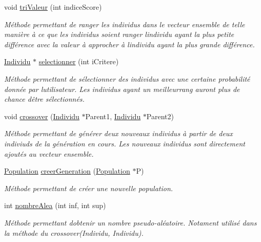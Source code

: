 \begin{DoxyCompactItemize}
void \hyperlink{class_population_a4b167d07f145a1f1ea69b2bb4cfd2cfb}{tri\+Valeur} (int indice\+Score)
\begin{DoxyCompactList}\small\item\em Méthode permettant de ranger les individus dans le vecteur ensemble de telle manière à ce que les individus soient ranger l\textquotesingle{}individu ayant la plus petite différence avec la valeur à approcher à l\textquotesingle{}individu ayant la plus grande différence. \end{DoxyCompactList}\item 
\hyperlink{class_individu}{Individu} $\ast$ \hyperlink{class_population_a30fcbcf36eb009493208310fecdf3729}{selectionner} (int i\+Critere)
\begin{DoxyCompactList}\small\item\em Méthode permettant de sélectionner des individus avec une certaine probabilité donnée par l\textquotesingle{}utilisateur. Les individus ayant un meilleurrang auront plus de chance d\textquotesingle{}être sélectionnés. \end{DoxyCompactList}\item 
void \hyperlink{class_population_a728129af67cfe97c0fa16d0728101a28}{crossover} (\hyperlink{class_individu}{Individu} $\ast$Parent1, \hyperlink{class_individu}{Individu} $\ast$Parent2)
\begin{DoxyCompactList}\small\item\em Méthode permettant de générer deux nouveaux individus à partir de deux indiviuds de la génération en cours. Les nouveaux individus sont directement ajoutés au vecteur ensemble. \end{DoxyCompactList}\item 
\hyperlink{class_population}{Population} \hyperlink{class_population_af3c4abb60e3dcd0eb183014a9d21419c}{creer\+Generation} (\hyperlink{class_population}{Population} $\ast$P)
\begin{DoxyCompactList}\small\item\em Méthode permettant de créer une nouvelle population. \end{DoxyCompactList}\item 
int \hyperlink{class_population_a0bacc7dadc8ab903261ff053344a9e36}{nombre\+Alea} (int inf, int sup)
\begin{DoxyCompactList}\small\item\em Méthode permettant d\textquotesingle{}obtenir un nombre pseudo-\/aléatoire. Notament utilisé dans la méthode du crossover(\+Individu, Individu). \end{DoxyCompactList}\end{DoxyCompactItemize}


